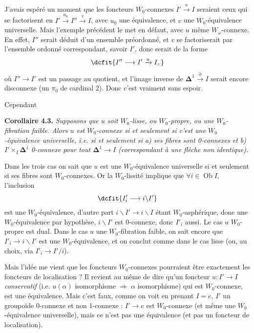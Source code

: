 \documentclass[11pt]{article}
\def\dcprintedpending{}
\newcommand{\msp}[1]{\marginpar{\footnotesize\raggedright
  \ifx\dcprintedpending\empty\else p.~\dcprintedpending\par\fi
  [#1]}\gdef\dcprintedpending{}}
\newcommand{\Ob}{\operatorname{Ob}}
\newcommand{\bDelta}{\boldsymbol{\Delta}}
\begin{document}
J'avais espéré un moment que les foncteurs $W_0$-connexes $I' \xrightarrow{u} I$ seraient ceux qui se factorisent en $I' \xrightarrow{u_0} I'' \xrightarrow{v} I$, avec $u_0$ une équivalence, et $v$ une $W_0$-équivalence universelle. Mais l'exemple précédent le met en défaut, avec $u$ même $W_\omega$-connexe. En effet, $I''$ serait déduit d'un ensemble préordonné, et $v$ se factoriserait par l'ensemble ordonné correspondant, savoir $I'$, donc serait de la forme
\[
\dcfit{I'' \longrightarrow I' \xrightarrow{u} I,
}
\]
où $I'' \longrightarrow I'$ est un passage au quotient, et l'image inverse de $\bDelta^1 \xrightarrow{\partial} I$ serait encore disconnexe (un $\pi_0$ de cardinal 2). Donc c'est vraiment sans espoir.

Cependant

\textbf{Corollaire 4.3.} \textit{Supposons que $u$ soit $W_0$-lisse, ou $W_0$-propre, ou une $W_0$-fibration faible. Alors $u$ est $W_0$-connexe si et seulement si c'est une $W_0$-équivalence universelle, i.e. si et seulement si a) ses fibres sont \textup{0}-connexes et b) $I' \times_I \bDelta^1$} \textit{\textup{0}-connexe pour tout $\bDelta^1 \longrightarrow I$ (correspondant à une flèche non identique).}

\msp{page 59}Dans les trois cas on sait que $u$ est une $W_0$-équivalence universelle si et seulement si ses fibres sont $W_0$-connexes. Or la $W_0$-lissité implique que $\forall i \in \Ob I$, l'inclusion
\[
\dcfit{I'_i \longrightarrow i\backslash I'
}
\]
est une $W_0$-équivalence, d'autre part $i\backslash I' \longrightarrow i\backslash I$ étant $W_0$-asphérique, donc une $W_0$-équivalence par hypothèse, $i\backslash I'$ est 0-connexe, donc $I'_i$ aussi. Le cas $u$ $W_0$-propre est dual. Dans le cas $u$ une $W_0$-fibration faible, on sait encore que $I'_i \longrightarrow i\backslash I'$ est une $W_0$-équivalence, et on conclut comme dans le cas lisse (ou, au choix, via $I'_i \longrightarrow I'/i$).

Mais l'idée me vient que les foncteurs $W_0$-connexes pourraient être exactement les foncteurs de localisation ? Il revient au même de dire qu'un foncteur $u : I' \longrightarrow I$ \textit{conservatif} (i.e. $u(\alpha)$ isomorphisme $\Longrightarrow$ $\alpha$ isomorphisme) qui est $W_0$-connexe, est une équivalence. Mais c'est faux, comme on voit en prenant $I = e$, $I'$ un groupoïde 0-connexe et non 1-connexe : $I' \longrightarrow e$ est $W_0$-connexe (et même une $W_0$-équivalence universelle), mais ce n'est pas une équivalence (et pas un foncteur de localisation).
\end{document}
